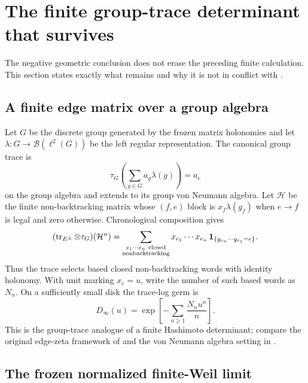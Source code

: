 \section{The finite group-trace determinant that survives}
\label{sec:grouptrace}

The negative geometric conclusion does not erase the preceding finite
calculation.  This section states exactly what remains and why it is not in
conflict with .

\subsection{A finite edge matrix over a group algebra}

Let $G$ be the discrete group generated by the frozen matrix holonomies and
let $\lambda:G\to\mathcal B(\ell^2(G))$ be the left regular representation.
The canonical group trace is
\begin{equation}
 \tau_G\!\left(\sum_{g\in G}a_g\lambda(g)\right)=a_e
 \label{eq:group-trace}
\end{equation}
on the group algebra and extends to its group von Neumann algebra.  Let
$\mathcal H$ be the finite non-backtracking matrix whose $(f,e)$ block is
$x_f\lambda(g_f)$ when $e\to f$ is legal and zero otherwise.  Chronological
composition gives
\begin{equation}
 (\operatorname{tr}_{E^\pm}\otimes\tau_G)(\mathcal H^n)
 =\sum_{\substack{e_1\cdots e_n\ {\rm closed}\\
                   {\rm nonbacktracking}}}
 x_{e_1}\cdots x_{e_n}\,
 \mathbf 1_{\{g_{e_n}\cdots g_{e_1}=e\}}.
 \label{eq:group-moment}
\end{equation}
Thus the trace selects based closed non-backtracking words with identity
holonomy.  With unit marking $x_e=u$, write the number of such based words as
$N_n$.  On a sufficiently small disk the trace-log germ is
\begin{equation}
 D_\infty(u)
 =\exp\!\left[-\sum_{n\geq1}\frac{N_nu^n}{n}\right].
 \label{eq:group-determinant}
\end{equation}
This is the group-trace analogue of a finite Hashimoto determinant; compare
the original edge-zeta framework of
\citet{Hashimoto1989,StarkTerras1996} and the von Neumann algebra setting in
\citet{LenzPogorzelskiSchmidt2019}.

\subsection{The frozen normalized finite-Weil limit}

